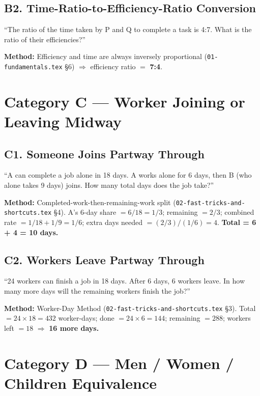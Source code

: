 \documentclass[11pt]{article}
\begin{document}
\subsection*{B2. Time-Ratio-to-Efficiency-Ratio Conversion}
\begin{tipbox}[Phrasing]
``The ratio of the time taken by P and Q to complete a task is 4:7. What is the ratio of their
efficiencies?''
\end{tipbox}
\textbf{Method:} Efficiency and time are always inversely proportional
(\texttt{01-fundamentals.tex} \S6) $\Rightarrow$ efficiency ratio $=$ \textbf{7:4}.

\section*{Category C --- Worker Joining or Leaving Midway}

\subsection*{C1. Someone Joins Partway Through}
\begin{tipbox}[Phrasing]
``A can complete a job alone in 18 days. A works alone for 6 days, then B (who alone takes 9 days)
joins. How many total days does the job take?''
\end{tipbox}
\textbf{Method:} Completed-work-then-remaining-work split
(\texttt{02-fast-tricks-and-shortcuts.tex} \S4). A's 6-day share $=6/18=1/3$; remaining $=2/3$;
combined rate $=1/18+1/9=1/6$; extra days needed $=(2/3)/(1/6)=4$. \textbf{Total = 6 + 4 = 10 days.}

\subsection*{C2. Workers Leave Partway Through}
\begin{tipbox}[Phrasing]
``24 workers can finish a job in 18 days. After 6 days, 6 workers leave. In how many more days will
the remaining workers finish the job?''
\end{tipbox}
\textbf{Method:} Worker-Day Method (\texttt{02-fast-tricks-and-shortcuts.tex} \S3). Total
$=24\times18=432$ worker-days; done $=24\times6=144$; remaining $=288$; workers left $=18$
$\Rightarrow$ \textbf{16 more days.}

\section*{Category D --- Men / Women / Children Equivalence}
\end{document}

